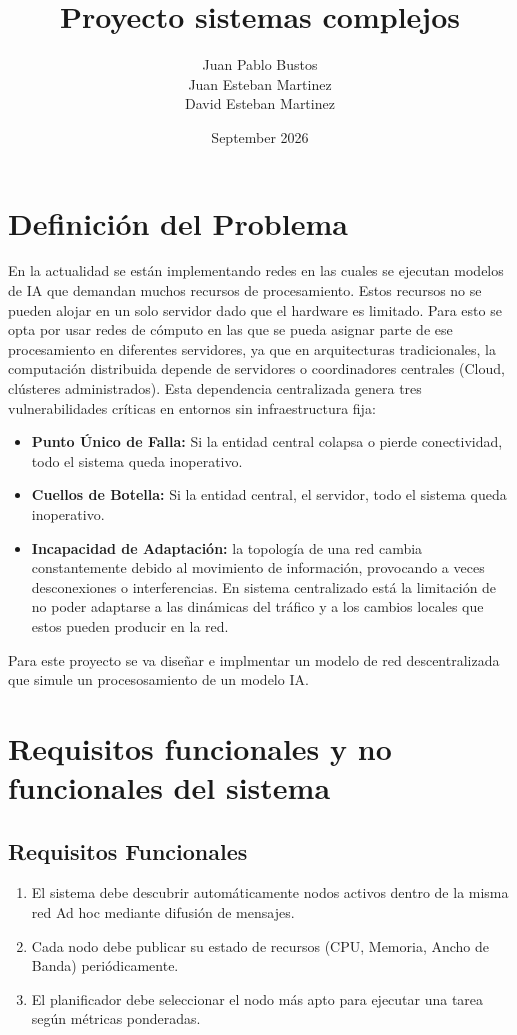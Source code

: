 \documentclass{article}
\title{Proyecto sistemas complejos}
\author{
Juan Pablo Bustos \\
Juan Esteban Martinez \\
David Esteban Martinez
}
\date{September 2026}
\begin{document}
\maketitle

\section{Definición del Problema}
En la actualidad se están implementando redes en las cuales se ejecutan modelos de IA que demandan muchos recursos de procesamiento. Estos recursos no se pueden alojar en un solo servidor dado que el hardware es limitado. Para esto se opta por usar redes de cómputo en las que se pueda asignar parte de ese procesamiento en diferentes servidores, ya que en arquitecturas tradicionales, la computación distribuida depende de servidores o coordinadores centrales (Cloud, clústeres administrados). Esta dependencia centralizada genera tres vulnerabilidades críticas en entornos sin infraestructura fija:
\begin{itemize}
    \item \textbf{Punto Único de Falla:} Si la entidad central colapsa o pierde conectividad, todo el sistema queda inoperativo.
    \item \textbf{Cuellos de Botella:} Si la entidad central, el servidor, todo el sistema queda inoperativo.
    \item \textbf{Incapacidad de Adaptación:} la topología de una red cambia constantemente debido al movimiento de información, provocando a veces desconexiones o interferencias. En sistema centralizado está la limitación de no poder adaptarse a las dinámicas del tráfico y a los cambios locales que estos pueden producir en la red.
\end{itemize}
Para este proyecto se va diseñar e implmentar un modelo de red descentralizada que simule un procesosamiento de un modelo IA.

\section{Requisitos funcionales y no funcionales del sistema}
    \subsection{Requisitos Funcionales}
    \begin{enumerate}
        \item El sistema debe descubrir automáticamente nodos activos dentro de la misma red Ad hoc mediante difusión de mensajes.
        \item Cada nodo debe publicar su estado de recursos (CPU, Memoria, Ancho de Banda) periódicamente.
        \item El planificador debe seleccionar el nodo más apto para ejecutar una tarea según métricas ponderadas.
    \end{enumerate}
\end{document}
